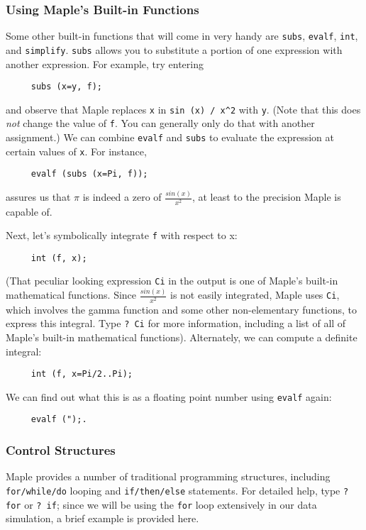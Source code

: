 \subsubsection{Using Maple's Built-in Functions}

Some other built-in functions that will come in very handy are
\verb|subs|, \verb|evalf|, \verb|int|, and \verb|simplify|.
\verb|subs| allows you to substitute a portion of one expression 
with another expression.  For example, try entering
\begin{verbatim}
     subs (x=y, f);
\end{verbatim}
and observe that Maple replaces \verb|x| in \verb|sin (x) / x^2| with \verb|y|.
(Note that this does {\em not} change the value of \verb|f|.  You can
generally only do that with another assignment.)  We can combine
\verb|evalf| and \verb|subs| to evaluate the expression at certain
values of \verb|x|.  For instance, 
\begin{verbatim}
     evalf (subs (x=Pi, f));
\end{verbatim}
assures us that $\pi$ is indeed a zero of $\frac{sin(x)}{x^{2}}$, at
least to the precision Maple is capable of. 

Next, let's symbolically integrate \verb|f| with respect to x:
\begin{verbatim}
     int (f, x);
\end{verbatim}
(That peculiar looking expression \verb|Ci| in the output is one of
Maple's built-in mathematical functions.  Since $\frac{sin(x)}{x^{2}}$
is not easily integrated, Maple uses \verb|Ci|, which involves the
gamma function and some other non-elementary functions, to express
this integral.  Type \verb|? Ci| for more information, including a
list of all of Maple's built-in mathematical functions).  Alternately,
we can compute a definite integral:
\begin{verbatim}
     int (f, x=Pi/2..Pi);
\end{verbatim}
We can find out what this is as a floating point number using
\verb|evalf| again:
\begin{verbatim}
     evalf (");.
\end{verbatim}

\subsubsection{Control Structures}

Maple provides a number of traditional programming structures,
including \verb|for/while/do| looping and \verb|if/then/else|
statements.  For detailed help, type \verb|? for| or \verb|? if|;
since we will be using the \verb|for| loop extensively in our data
simulation, a brief example is provided here.

